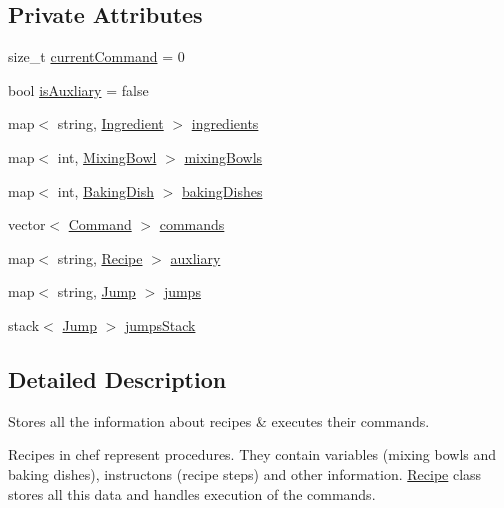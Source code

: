 \subsection*{Private Attributes}
\begin{DoxyCompactItemize}
\item 
size\-\_\-t \hyperlink{classRecipe_ab29f1a07d6c30a5c7b4da4ab53822c49}{current\-Command} = 0
\item 
bool \hyperlink{classRecipe_a3edfc934ad30f52f01dc90630b0decaa}{is\-Auxliary} = false
\item 
map$<$ string, \hyperlink{classIngredient}{Ingredient} $>$ \hyperlink{classRecipe_a9cf0fa9aedac7925a49a5655401a2680}{ingredients}
\item 
map$<$ int, \hyperlink{classDish}{Mixing\-Bowl} $>$ \hyperlink{classRecipe_ad21a1bda0d75378dd9b53c1abb76524f}{mixing\-Bowls}
\item 
map$<$ int, \hyperlink{classDish}{Baking\-Dish} $>$ \hyperlink{classRecipe_aae370ab1573cc3222fa5a77c9ed5cee4}{baking\-Dishes}
\item 
vector$<$ \hyperlink{structCommand}{Command} $>$ \hyperlink{classRecipe_ae1419284a891adb4ae550d6ea4c76df8}{commands}
\item 
map$<$ string, \hyperlink{classRecipe}{Recipe} $>$ \hyperlink{classRecipe_af7f123d033d11cc87b2113c7a208cd83}{auxliary}
\item 
map$<$ string, \hyperlink{structJump}{Jump} $>$ \hyperlink{classRecipe_a0e57db5b119a8dcc06cfd79a0d1857ed}{jumps}
\item 
stack$<$ \hyperlink{structJump}{Jump} $>$ \hyperlink{classRecipe_a66460d610a0717995788284a3d4c4ba5}{jumps\-Stack}
\end{DoxyCompactItemize}


\subsection{Detailed Description}
Stores all the information about recipes \& executes their commands. 

Recipes in chef represent procedures. They contain variables (mixing bowls and baking dishes), instructons (recipe steps) and other information. \hyperlink{classRecipe}{Recipe} class stores all this data and handles execution of the commands. 

